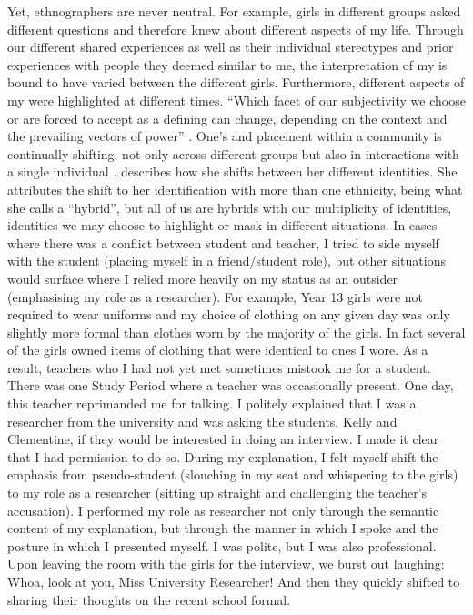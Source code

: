 
Yet, ethnographers are never neutral. For example, girls in different groups asked different questions and therefore knew about different aspects of my life. Through our different shared experiences as well as their individual stereotypes and prior experiences with people they deemed similar to me, the interpretation of my  is bound to have varied between the different girls. Furthermore, different aspects of my  were highlighted at different times. ``Which facet of our subjectivity we choose or are forced to accept as a defining  can change, depending on the context and the prevailing vectors of power'' \citep[676]{narayan1993}. One's  and placement within a community is continually shifting, not only across different groups but also in interactions with a single individual \citep[680]{narayan1993}. \citet{mani1990} describes how she shifts between her different identities. She attributes the shift to her identification with more than one ethnicity, being what she calls a ``hybrid'', but all of us are hybrids with our multiplicity of identities, identities we may choose to highlight or mask in different situations. In cases where there was a conflict between student and teacher, I tried to side myself with the student (placing myself in a friend/student role), but other situations would surface where I relied more heavily on my status as an outsider (emphasising my role as a researcher). For example, Year 13 girls were not required to wear uniforms and my choice of clothing on any given day was only slightly more formal than clothes worn by the majority of the girls. In fact several of the girls owned items of clothing that were identical to ones I wore. As a result, teachers who I had not yet met sometimes mistook me for a student. There was one Study Period where a teacher was occasionally present. One day, this teacher reprimanded me for talking. I politely explained that I was a researcher from the university and was asking the students, Kelly and Clementine, if they would be interested in doing an interview. I made it clear that I had permission to do so. During my explanation, I felt myself shift the emphasis from pseudo-student (slouching in my seat and whispering to the girls) to my role as a researcher (sitting up straight and challenging the teacher's accusation). I performed my role as researcher not only through the semantic content of my explanation, but through the manner in which I spoke and the posture in which I presented myself. I was polite, but I was also professional. Upon leaving the room with the girls for the interview, we burst out laughing: Whoa, look at you, Miss University Researcher! And then they quickly shifted to sharing their thoughts on the recent school formal.


